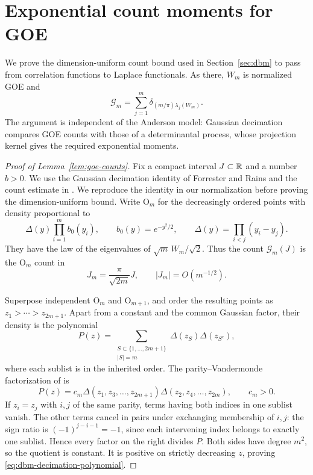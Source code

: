 \section{Exponential count moments for GOE}\label{app:goe-counts}

We prove the dimension-uniform count bound used in
Section~\ref{sec:dbm} to pass from correlation functions to Laplace
functionals.  As there, \(W_m\) is normalized GOE and
\[
 \mathcal G_m=\sum_{j=1}^m
       \delta_{(m/\pi)\lambda_j(W_m)}.
\]
The argument is independent of the Anderson model: Gaussian decimation
compares GOE counts with those of a determinantal process, whose
projection kernel gives the required exponential moments.

\begin{proof}[Proof of Lemma~\ref{lem:goe-counts}]
Fix a compact interval \(J\subset\mathbb R\) and a number \(b>0\).
We use the Gaussian decimation identity of Forrester and Rains
\cite[arXiv version~2, Theorem~5.2 and Equation~(5.9)]{ForresterRains2001}
and the count estimate in \cite[Lemma~6.3]{bu}. We reproduce the identity
in our normalization before proving the dimension-uniform bound.
Write \(\mathrm O_m\) for the decreasingly ordered
points with density proportional to
\[
 \Delta(y)\prod_{i=1}^m b_0(y_i),\qquad
 b_0(y)=e^{-y^2/2},\qquad
 \Delta(y)=\prod_{i<j}(y_i-y_j).
\]
They have the law of the eigenvalues of \(\sqrt m\,W_m/\sqrt2\).
Thus the count \(\mathcal G_m(J)\) is the \(\mathrm O_m\) count in
\[
 J_m=\frac{\pi}{\sqrt{2m}}J,
 \qquad |J_m|=O(m^{-1/2}).
\]

Superpose independent \(\mathrm O_m\) and \(\mathrm O_{m+1}\),
and order the resulting points as
\(z_1>\cdots>z_{2m+1}\). Apart from a constant and the common Gaussian
factor, their density is the polynomial
\[
 P(z)=\sum_{\substack{S\subset\{1,\ldots,2m+1\}\\|S|=m}}
          \Delta(z_S)\Delta(z_{S^c}),
\]
where each sublist is in the inherited order. The parity--Vandermonde
factorization of
\cite[arXiv version~2, Lemma~4.1 and Equation~(4.2)]{ForresterRains2001} is
\begin{equation}
 \label{eq:dbm-decimation-polynomial}
 P(z)=c_m\Delta(z_1,z_3,\ldots,z_{2m+1})
             \Delta(z_2,z_4,\ldots,z_{2m}),\qquad c_m>0.
\end{equation}
If \(z_i=z_j\) with \(i,j\) of the same parity, terms having
both indices in one sublist vanish. The other terms cancel in pairs
under exchanging membership of \(i,j\): the sign ratio is
\((-1)^{j-i-1}=-1\), since each intervening index belongs to exactly
one sublist. Hence every factor on the right divides \(P\).
Both sides have degree \(m^2\), so the quotient is constant.
It is positive on strictly decreasing \(z\), proving
\eqref{eq:dbm-decimation-polynomial}.


\end{proof}
